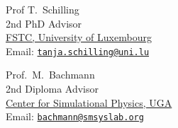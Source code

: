 \documentclass{article}
\begin{document}
\vspace{2ex}
\begin{minipage}{0.45\linewidth}
Prof T.\ Schilling
\vspace{-2mm}\\
{\tiny 2nd PhD Advisor}\\
\href{www.tanjaschilling.de}{FSTC, University of Luxembourg} \\
Email: \href{mailto:tanja.schilling@uni.lu}{\tt tanja.schilling@uni.lu}
\end{minipage}
\begin{minipage}{0.45\linewidth}
Prof.\ M.\ Bachmann
\vspace{-2mm}\\
{\tiny 2nd Diploma Advisor}\\
\href{http://www.smsyslab.org}{Center for Simulational Physics, UGA} \\
Email: \href{mailto:bachmann@smsyslab.org}{\tt bachmann@smsyslab.org}
\end{minipage}
\end{document}

